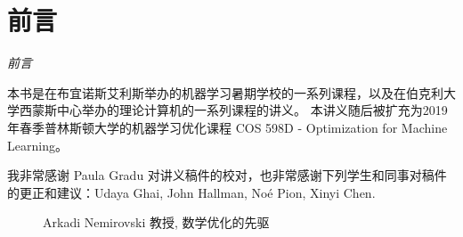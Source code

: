 \chapter*{
        前言
        }
       {\sffamily\slshape 
       前言
       }

本书是在布宜诺斯艾利斯举办的机器学习暑期学校的一系列课程，以及在伯克利大学西蒙斯中心举办的理论计算机的一系列课程的讲义。
本讲义随后被扩充为2019年春季普林斯顿大学的机器学习优化课程 COS 598D - Optimization for Machine Learning。

我非常感谢 Paula Gradu 对讲义稿件的校对，也非常感谢下列学生和同事对稿件的更正和建议：Udaya Ghai, John Hallman, No\'{e} Pion, Xinyi Chen. 



\begin{figure}[!htb]
        \caption{\label{fig:my-label}
        Arkadi Nemirovski 教授, 数学优化的先驱
        }
\end{figure}
    


